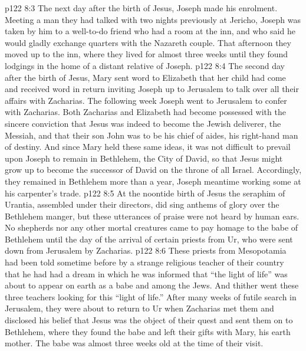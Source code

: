 \vs p122 8:3 The next day after the birth of Jesus, Joseph made his enrolment. Meeting a man they had talked with two nights previously at Jericho, Joseph was taken by him to a well\hyp{}to\hyp{}do friend who had a room at the inn, and who said he would gladly exchange quarters with the Nazareth couple. That afternoon they moved up to the inn, where they lived for almost three weeks until they found lodgings in the home of a distant relative of Joseph.
\vs p122 8:4 The second day after the birth of Jesus, Mary sent word to Elizabeth that her child had come and received word in return inviting Joseph up to Jerusalem to talk over all their affairs with Zacharias. The following week Joseph went to Jerusalem to confer with Zacharias. Both Zacharias and Elizabeth had become possessed with the sincere conviction that Jesus was indeed to become the Jewish deliverer, the Messiah, and that their son John was to be his chief of aides, his right\hyp{}hand man of destiny. And since Mary held these same ideas, it was not difficult to prevail upon Joseph to remain in Bethlehem, the City of David, so that Jesus might grow up to become the successor of David on the throne of all Israel. Accordingly, they remained in Bethlehem more than a year, Joseph meantime working some at his carpenter’s trade.
\vs p122 8:5 \pc At the noontide birth of Jesus the seraphim of Urantia, assembled under their directors, did sing anthems of glory over the Bethlehem manger, but these utterances of praise were not heard by human ears. No shepherds nor any other mortal creatures came to pay homage to the babe of Bethlehem until the day of the arrival of certain priests from Ur, who were sent down from Jerusalem by Zacharias.
\vs p122 8:6 These priests from Mesopotamia had been told sometime before by a strange religious teacher of their country that he had had a dream in which he was informed that “the light of life” was about to appear on earth as a babe and among the Jews. And thither went these three teachers looking for this “light of life.” After many weeks of futile search in Jerusalem, they were about to return to Ur when Zacharias met them and disclosed his belief that Jesus was the object of their quest and sent them on to Bethlehem, where they found the babe and left their gifts with Mary, his earth mother. The babe was almost three weeks old at the time of their visit.
